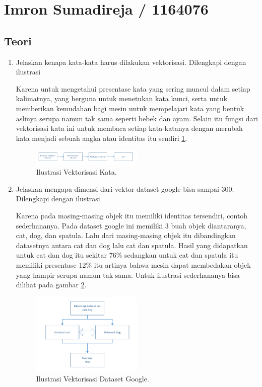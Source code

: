 \section{Imron Sumadireja / 1164076}
\subsection{Teori}
\begin{enumerate}
\item Jelaskan kenapa kata-kata harus dilakukan vektorisasi. Dilengkapi dengan ilustrasi \par
Karena untuk mengetahui presentase kata yang sering muncul dalam setiap kalimatnya, yang berguna untuk menetukan kata kunci, serta untuk memberikan kemudahan bagi mesin untuk mempelajari kata yang bentuk aslinya serupa namun tak sama seperti bebek dan ayam. Selain itu fungsi dari vektorisasi kata ini untuk membaca setiap kata-katanya dengan merubah kata menjadi sebuah angka atau identitas itu sendiri \ref{vek1}.
		\begin{figure}[!htbp]
		\centerline{\includegraphics[width=0.5\textwidth]{figures/im/vek1.png}}
		\caption{Ilustrasi Vektorisasi Kata.}
		\label{vek1}
		\end{figure}

\item Jelaskan mengapa dimensi dari vektor dataset google bisa sampai 300. Dilengkapi dengan ilustrasi \par
Karena pada masing-masing objek itu memiliki identitas tersendiri, contoh sederhananya. Pada dataset google ini memiliki 3 buah objek diantaranya, cat, dog, dan spatula. Lalu dari masing-masing objek itu dibandingkan datasetnya antara cat dan dog lalu cat dan spatula. Hasil yang didapatkan untuk cat dan dog itu sekitar 76\% sedangkan untuk cat dan spatula itu memiliki presentase 12\% itu artinya bahwa mesin dapat membedakan objek yang hampir serupa namun tak sama. Untuk ilustrasi sederhananya bisa dilihat pada gambar \ref{vek2}.
		\begin{figure}[!htbp]
		\centerline{\includegraphics[width=0.5\textwidth]{figures/im/vek2.png}}
		\caption{Ilustrasi Vektorisasi Dataset Google.}
		\label{vek2}
		\end{figure}


\end{enumerate}
